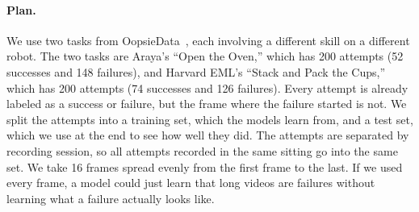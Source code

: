 \documentclass{article}
\begin{document}
\paragraph{Plan.} We use two tasks from OopsieData~\citep{oopsiedata}, each involving a different skill on a different robot. The two tasks are Araya's ``Open the Oven,'' which has 200 attempts (52 successes and 148 failures), and Harvard EML's ``Stack and Pack the Cups,'' which has 200 attempts (74 successes and 126 failures). Every attempt is already labeled as a success or failure, but the frame where the failure started is not. We split the attempts into a training set, which the models learn from, and a test set, which we use at the end to see how well they did. The attempts are separated by recording session, so all attempts recorded in the same sitting go into the same set. We take 16 frames spread evenly from the first frame to the last. If we used every frame, a model could just learn that long videos are failures without learning what a failure actually looks like.
\end{document}
